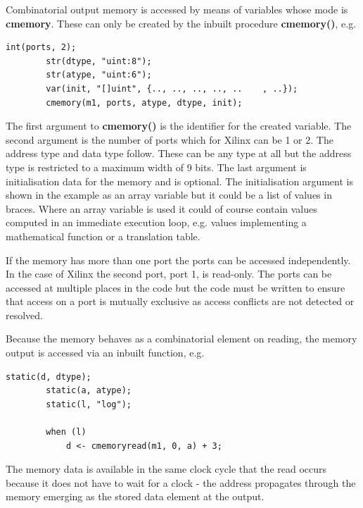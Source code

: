\documentclass[10pt,a4paper,twoside,fleqn]{article}
\newcommand{\kwd}[1]{{\bf #1}} %
\begin{document}
    Combinatorial output memory is accessed by means of variables whose mode
    is \kwd{cmemory}. These can only be created by the inbuilt procedure
    \kwd{cmemory()}, e.g.
    \begin{lstlisting}[language=threepl]
        int(ports, 2);
        str(dtype, "uint:8");
        str(atype, "uint:6");
        var(init, "[]uint", {.., .., .., .., ..    , ..});
        cmemory(m1, ports, atype, dtype, init);
    \end{lstlisting}
    The first argument to \kwd{cmemory()} is the identifier for the created
    variable. The second argument is the number of ports which for Xilinx
    can be 1 or 2. The address type and data type follow. These can be any type
    at all but the address type is restricted to a maximum width of 9 bits.
    The last argument is initialisation data for the memory and is optional.
    The initialisation argument is shown in the example as an array variable
    but it could be a list of values in braces. Where an array variable is
    used it could of course contain values computed in an immediate execution
    loop, e.g. values implementing a mathematical function or a translation table.
    
    If the memory has more than one port the ports can be accessed independently.
    In the case of Xilinx the second port, port 1, is read-only. The ports can
    be accessed at multiple places in the code but the code must be written
    to ensure that access on a port is mutually exclusive as access conflicts are
    not detected or resolved.
    
    Because the memory behaves as a combinatorial element on reading, the memory
    output is accessed via an inbuilt function, e.g.
    \begin{lstlisting}[language=threepl]
        static(d, dtype);
        static(a, atype);
        static(l, "log");

        when (l)
            d <- cmemoryread(m1, 0, a) + 3;
    \end{lstlisting}
    The memory data is available in the same clock cycle that the read occurs
    because it does not have to wait for a clock - the address propagates through
    the memory emerging as the stored data element at the output.
\end{document}
